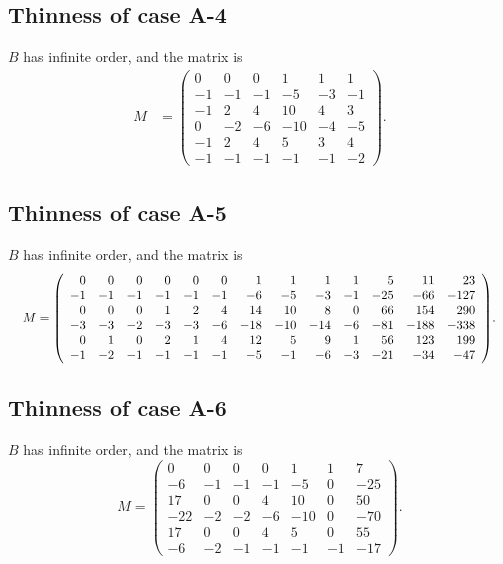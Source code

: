 \documentclass[11pt,a4paper]{amsart}
\theoremstyle{definition}
\theoremstyle{definition}
\numberwithin{equation}{section}
\begin{document}
\subsection{Thinness of case A-4}
$B$ has infinite order, and the matrix is
\begin{align*}
M & =\left(\begin{array}{rrrrrr}
0 & 0 & 0 & 1 & 1 & 1 \\
-1 & -1 & -1 & -5 & -3 & -1 \\
-1 & 2 & 4 & 10 & 4 & 3 \\
0 & -2 & -6 & -10 & -4 & -5 \\
-1 & 2 & 4 & 5 & 3 & 4 \\
-1 & -1 & -1 & -1 & -1 & -2
\end{array}\right).
\end{align*}

\subsection{Thinness of case A-5}
$B$ has infinite order, and the matrix is
\[
\resizebox{\textwidth}{!}{
$M=\left(\begin{array}{rrrrrrrrrrrrr}
0 & 0 & 0 & 0 & 0 & 0 & 1 & 1 & 1 & 1 & 5 & 11 & 23 \\
-1 & -1 & -1 & -1 & -1 & -1 & -6 & -5 & -3 & -1 & -25 & -66 & -127 \\
0 & 0 & 0 & 1 & 2 & 4 & 14 & 10 & 8 & 0 & 66 & 154 & 290 \\
-3 & -3 & -2 & -3 & -3 & -6 & -18 & -10 & -14 & -6 & -81 & -188 & -338 \\
0 & 1 & 0 & 2 & 1 & 4 & 12 & 5 & 9 & 1 & 56 & 123 & 199 \\
-1 & -2 & -1 & -1 & -1 & -1 & -5 & -1 & -6 & -3 & -21 & -34 & -47
\end{array}\right)$.
}
\]
\subsection{Thinness of case A-6}
$B$ has infinite order, and the matrix is
$$
M=\left(\begin{array}{rrrrrrr}
0 & 0 & 0 & 0 & 1 & 1 & 7 \\
-6 & -1 & -1 & -1 & -5 & 0 & -25 \\
17 & 0 & 0 & 4 & 10 & 0 & 50 \\
-22 & -2 & -2 & -6 & -10 & 0 & -70 \\
17 & 0 & 0 & 4 & 5 & 0 & 55 \\
-6 & -2 & -1 & -1 & -1 & -1 & -17
\end{array}\right).
$$
\end{document}
